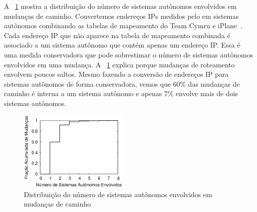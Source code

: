 A \figstr~\ref{fig:char.nasns} mostra a distribuição do número de
sistemas autônomos envolvidos em mudanças de caminho.  Convertemos
endereços IPs medidos pelo \dtrack{} em sistemas autônomos combinando as
tabelas de mapeamento do Team Cymru\footnotemark{} e
iPlane~\cite{madhyastha06iplane}.  Cada endereço IP que não aparece na
tabela de mapeamento combinada é associado a um sistema autônomo que
contém apenas um endereço IP.  Essa é uma medida conservadora que pode
sobrestimar o número de sistemas autônomos envolvidos em uma mudança.
A \figstr~\ref{fig:char.nasns} explica porque mudanças de roteamento
envolvem poucos saltos.  Mesmo fazendo a conversão de endereços IP para
sistemas autônomos de forma conservadora, vemos que 60\% das mudanças de
caminho é interna a um sistema autônomo e apenas 7\% envolve mais de
dois sistemas autônomos.


\begin{figure}[t]
\begin{center}
\includegraphics[width=0.47\textwidth]{figs/nasns.eps}
\caption{Distribuição do número de sistemas autônomos envolvidos em
mudanças de caminho}
\label{fig:char.nasns}
\end{center}
\end{figure}
